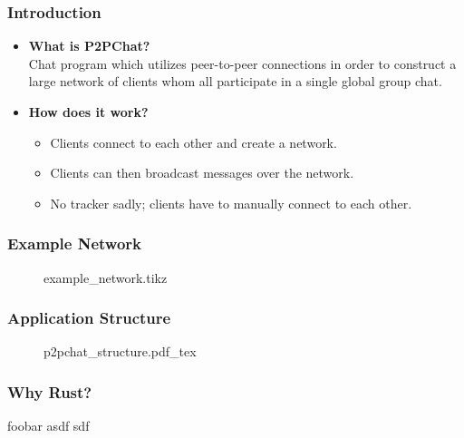 \begin{frame}
  \frametitle{Introduction}
  \begin{itemize}
    \item \textbf{What is P2PChat?}\\
      Chat program which utilizes peer-to-peer connections in order to construct a large network of clients whom all participate in a single global group chat.
    \item \textbf{How does it work?}
      \begin{itemize}
        \item Clients connect to each other and create a network.
        \item Clients can then broadcast messages over the network.
        \item No tracker sadly; clients have to manually connect to each other.
      \end{itemize}
  \end{itemize}
\end{frame}

\begin{frame}
  \frametitle{Example Network}
  \begin{figure}
    \centering
    {example_network.tikz}
  \end{figure}
\end{frame}

\begin{frame}
  \frametitle{Application Structure}
  \begin{figure}
    \def\svgwidth{\textwidth}
    {p2pchat_structure.pdf_tex}
  \end{figure}
\end{frame}

\begin{frame}
  \frametitle{Why Rust?}
  foobar asdf sdf

\end{frame}
